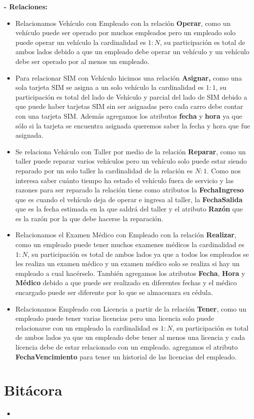 \documentclass[letterpaper,11pt]{article}
\begin{document}
\textbf{- Relaciones: }

\begin{itemize}
\item Relacionamos Vehículo con Empleado  con la relación 
      \textbf{Operar}, como un vehículo puede ser operado por muchos 
      empleados pero un empleado solo puede operar un vehículo 
      la cardinalidad es $1:N$, su participación es total de ambos 
      lados debido a que un empleado debe operar un vehículo y un 
      vehículo debe ser operado por al menos un empleado.
\item Para relacionar SIM con Vehículo hicimos 
      una relación \textbf{Asignar,} como una sola tarjeta SIM 
      se asigna a un solo vehículo la cardinalidad es $1:1$, su
      participación es total del lado de Vehículo y 
      parcial del lado de SIM debido a que puede haber tarjetas SIM 
      sin ser asignadas pero cada carro debe contar con una tarjeta 
      SIM. Además agregamos los atributos \textbf{fecha} y \textbf{hora} 
      ya que sólo si la tarjeta se encuentra asignada queremos saber 
      la fecha y hora que fue asignada. 
\item Se relaciona Vehículo con Taller por medio de la relación \textbf{Reparar},  como un taller puede reparar varios vehículos pero un vehículo solo puede estar siendo reparado por un solo taller la cardinalidad de la relación es $N:1$. Como nos interesa saber cuánto tiempo ha estado el vehículo fuera de servicio y las razones  para ser reparado la relación tiene como atributos la \textbf{FechaIngreso} que es cuando el vehículo deja de operar e ingresa al taller, la \textbf{FechaSalida} que es la fecha estimada en la que saldrá del taller y el atributo \textbf{Razón} que es la razón por la que debe hacerse la reparación.
\item Relacionamos el Examen Médico con Empleado con la relación 
      \textbf{Realizar}, como un empleado puede tener muchos 
      examenes médicos la cardinalidad es $1:N$, su participación 
      es total de ambos lados ya que a todos los empleados se les 
      realiza un examen médico y un examen médico solo se realiza 
      si hay un empleado a cual hacérselo. También agregamos los 
      atributos \textbf{Fecha}, \textbf{Hora} y \textbf{Médico}
      debido a que puede ser realizado en diferentes fechas y el médico 
      encargado puede ser diferente por lo que se almacenara su cédula. 
\item Relacionamos Empleado con Licencia a partir de la relación
      \textbf{Tener}, como un empleado puede tener varias licencias 
      pero una licencia solo puede relacionarse con un empleado 
      la cardinalidad es $1:N$, su participación es total de 
      ambos lados ya que un empleado debe tener al menos una licencia 
      y cada licencia debe de estar relacionado con un empleado. agregamos
      el atributo \textbf{FechaVencimiento} para tener un historial de 
      las licencias del empleado. 
\end{itemize}

\section{Bitácora}
\begin{itemize}
    \item

    \textsc{} 

\end{itemize}
\end{document}
